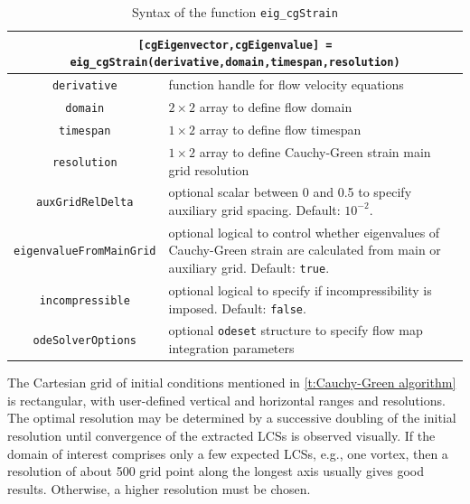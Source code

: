 \documentclass{elsarticle}
\begin{document}
\begin{table}
\begin{center}
\begin{tabular}{|c|p{}|}
\hline
\multicolumn{2}{|p{\textwidth}|}{\lstinline![cgEigenvector,cgEigenvalue] = eig_cgStrain(derivative,domain,timespan,resolution)!}\tabularnewline
\hline
\lstinline!derivative! & function handle for flow velocity equations\tabularnewline
\hline
\lstinline!domain! & $2 \times 2$ array to define flow domain\tabularnewline
\hline
\lstinline!timespan! & $1 \times 2$ array to define flow timespan\tabularnewline
\hline
\lstinline!resolution! & $1 \times 2$ array to define Cauchy-Green strain main grid resolution\tabularnewline
\hline
\lstinline!auxGridRelDelta! & optional scalar between 0 and 0.5 to specify auxiliary grid spacing. Default: $10^{-2}$.\tabularnewline
\hline
\lstinline!eigenvalueFromMainGrid! & optional logical to control whether eigenvalues of Cauchy-Green strain are calculated from main or auxiliary grid. Default: \lstinline!true!.\tabularnewline
\hline
\lstinline!incompressible! & optional logical to specify if incompressibility is imposed. Default: \lstinline!false!.\tabularnewline
\hline
\lstinline!odeSolverOptions! & optional \lstinline!odeset! structure to specify flow map integration parameters\tabularnewline
\hline
\end{tabular}
\caption{Syntax of the function \lstinline!eig_cgStrain!}
\label{t:eig_cgStrain syntax}
\end{center}
\end{table}


The Cartesian grid of initial conditions mentioned in \cref{t:Cauchy-Green algorithm} is rectangular, with user-defined vertical and horizontal ranges and resolutions. The optimal resolution may be determined by a successive doubling of the initial resolution until convergence of the extracted LCSs is observed visually. If the domain of interest comprises only a few expected LCSs, e.g., one vortex, then a resolution of about 500 grid point along the longest axis usually gives good results. Otherwise, a higher resolution must be chosen.
\end{document}

